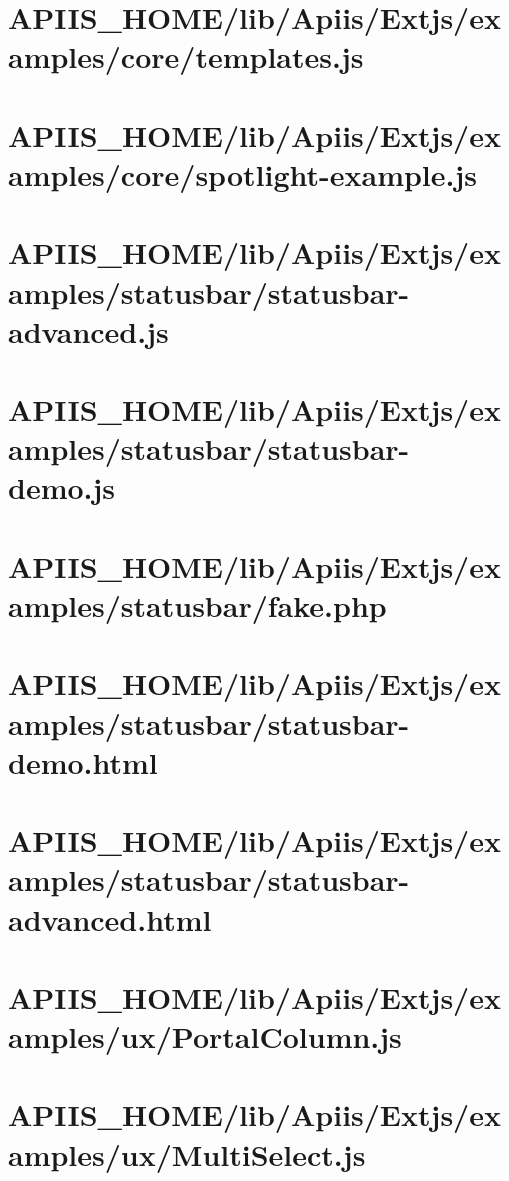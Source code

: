 \section{APIIS\_HOME/lib/Apiis/Extjs/examples/core/templates.js} 
\section{APIIS\_HOME/lib/Apiis/Extjs/examples/core/spotlight-example.js} 
\section{APIIS\_HOME/lib/Apiis/Extjs/examples/statusbar/statusbar-advanced.js} 
\section{APIIS\_HOME/lib/Apiis/Extjs/examples/statusbar/statusbar-demo.js} 
\section{APIIS\_HOME/lib/Apiis/Extjs/examples/statusbar/fake.php} 
\section{APIIS\_HOME/lib/Apiis/Extjs/examples/statusbar/statusbar-demo.html} 
\section{APIIS\_HOME/lib/Apiis/Extjs/examples/statusbar/statusbar-advanced.html} 
\section{APIIS\_HOME/lib/Apiis/Extjs/examples/ux/PortalColumn.js} 
\section{APIIS\_HOME/lib/Apiis/Extjs/examples/ux/MultiSelect.js} 
